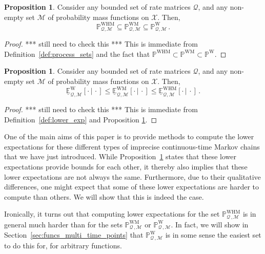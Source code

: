 \documentclass[10pt,a4paper]{paper}
\theoremstyle{definition}
\newtheorem{proposition}[theorem]{Proposition}
\newcommand{\states}{\mathcal{X}}
\newcommand{\processes}{\mathbb{P}}
\newcommand{\wprocesses}{\processes^{\mathrm{W}}}
\newcommand{\wmprocesses}{\processes^{\mathrm{WM}}}
\newcommand{\whmprocesses}{\processes^{\mathrm{WHM}}}
\newcommand{\rateset}{\mathcal{Q}}
\begin{document}
\begin{proposition}\label{prop:markov_set_subset_of_nonmarkov_set}
Consider any bounded set of rate matrices $\rateset$, and any non-empty set $\mathcal{M}$ of probability mass functions on $\states$. Then,
\begin{equation*}
\whmprocesses_{\rateset,\mathcal{M}} \subseteq \wmprocesses_{\rateset,\mathcal{M}} \subseteq \wprocesses_{\rateset,\mathcal{M}}\,.
\end{equation*}
\end{proposition}
\begin{proof}
*** still need to check this *** This is immediate from Definition~\ref{def:process_sets} and the fact that $\whmprocesses\subset\wmprocesses\subset\wprocesses$.
\end{proof}

\begin{proposition}\label{prop:lower_exp_markov_bounded_by_nonmarkov}
Consider any bounded set of rate matrices $\rateset$, and any non-empty set $\mathcal{M}$ of probability mass functions on $\states$. Then,
\begin{equation*}
\underline{\mathbb{E}}_{\rateset,\mathcal{M}}^\mathrm{W}[\cdot\,\vert\,\cdot] \leq
\underline{\mathbb{E}}_{\rateset,\mathcal{M}}^\mathrm{WM}[\cdot\,\vert\,\cdot] \leq
\underline{\mathbb{E}}_{\rateset,\mathcal{M}}^\mathrm{WHM}[\cdot\,\vert\,\cdot]\,.
\end{equation*}
\end{proposition}
\begin{proof}
*** still need to check this *** This is immediate from Definition~\ref{def:lower_exp} and Proposition \ref{prop:markov_set_subset_of_nonmarkov_set}.
\end{proof}

One of the main aims of this paper is to provide methods to compute the lower expectations for these different types of imprecise continuous-time Markov chains that we have just introduced. While Proposition~\ref{prop:lower_exp_markov_bounded_by_nonmarkov} states that these lower expectations provide bounds for each other, it thereby also implies that these lower expectations are not always the same. Furthermore, due to their qualitative differences, one might expect that some of these lower expectations are harder to compute than others. We will show that this is indeed the case.

Ironically, it turns out that computing lower expectations for the set $\whmprocesses_{\rateset\,,\mathcal{M}}$ is in general much harder than for the sets $\wmprocesses_{\rateset\,,\mathcal{M}}$ or $\wprocesses_{\rateset\,,\mathcal{M}}$. In fact, we will show in Section~\ref{sec:funcs_multi_time_points} that $\wprocesses_{\rateset\,,\mathcal{M}}$ is in some sense the easiest set to do this for, for arbitrary functions. 
\end{document}
